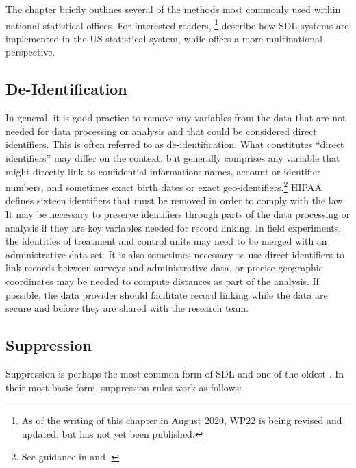 The chapter briefly outlines several of the methods most commonly used within national statistical offices. For interested readers, \citet{harris-kojetin_statistical_2005}\footnote{As of the writing of this chapter in August 2020, WP22 is being revised and updated, but has not yet been published.} describe how SDL systems are implemented in the US statistical system, while \citet{dupriez_dissemination_2010} offers a more multinational perspective.

\hypertarget{de-identification}{%
\subsection{De-Identification}\label{de-identification}}

In general, it is good practice to remove any variables from the data that are not needed for data processing or analysis and that could be considered direct identifiers. This is often referred to as de-identification. What constitutes ``direct identifiers'' may differ on the context, but generally comprises any variable that might directly link to confidential information: names, account or identifier numbers, and sometimes exact birth dates or exact geo-identifiers.\footnote{See guidance in \citet{world_bank_dime_nodate} and \citet{kopper_j-pal_2020}.} HIPAA defines sixteen identifiers that must be removed in order to comply with the law. It may be necessary to preserve identifiers through parts of the data processing or analysis if they are key variables needed for record linking. In field experiments, the identities of treatment and control units may need to be merged with an administrative data set. It is also sometimes necessary to use direct identifiers to link records between surveys and administrative data, or precise geographic coordinates may be needed to compute distances as part of the analysis. If possible, the data provider should facilitate record linking while the data are secure and before they are shared with the research team.

\hypertarget{suppression}{%
\subsection{Suppression}\label{suppression}}

Suppression is perhaps the most common form of SDL and one of the oldest \citep{fellegi_question_1972}. In their most basic form, suppression rules work as follows:

